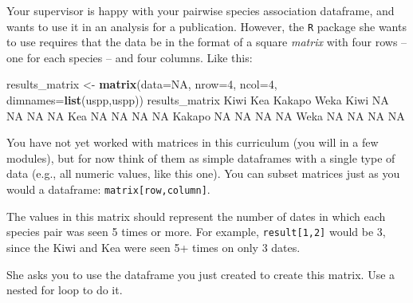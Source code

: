\documentclass[
]{book}
\newenvironment{Shaded}{\begin{snugshade}}{\end{snugshade}}
\newcommand{\DataTypeTok}[1]{\textcolor[rgb]{0.13,0.29,0.53}{#1}}
\newcommand{\DecValTok}[1]{\textcolor[rgb]{0.00,0.00,0.81}{#1}}
\newcommand{\KeywordTok}[1]{\textcolor[rgb]{0.13,0.29,0.53}{\textbf{#1}}}
\newcommand{\NormalTok}[1]{#1}
\newcommand{\OtherTok}[1]{\textcolor[rgb]{0.56,0.35,0.01}{#1}}
\newcommand{\StringTok}[1]{\textcolor[rgb]{0.31,0.60,0.02}{#1}}
\begin{document}
Your supervisor is happy with your pairwise species association dataframe, and wants to use it in an analysis for a publication. However, the \texttt{R} package she wants to use requires that the data be in the format of a square \emph{matrix} with four rows -- one for each species -- and four columns. Like this:

\begin{Shaded}
\begin{Highlighting}[]
\NormalTok{results_matrix <-}\StringTok{ }\KeywordTok{matrix}\NormalTok{(}\DataTypeTok{data=}\OtherTok{NA}\NormalTok{, }\DataTypeTok{nrow=}\DecValTok{4}\NormalTok{, }\DataTypeTok{ncol=}\DecValTok{4}\NormalTok{, }\DataTypeTok{dimnames=}\KeywordTok{list}\NormalTok{(uspp,uspp))}
\NormalTok{results_matrix}
\NormalTok{       Kiwi Kea Kakapo Weka}
\NormalTok{Kiwi     }\OtherTok{NA}  \OtherTok{NA}     \OtherTok{NA}   \OtherTok{NA}
\NormalTok{Kea      }\OtherTok{NA}  \OtherTok{NA}     \OtherTok{NA}   \OtherTok{NA}
\NormalTok{Kakapo   }\OtherTok{NA}  \OtherTok{NA}     \OtherTok{NA}   \OtherTok{NA}
\NormalTok{Weka     }\OtherTok{NA}  \OtherTok{NA}     \OtherTok{NA}   \OtherTok{NA}
\end{Highlighting}
\end{Shaded}

You have not yet worked with matrices in this curriculum (you will in a few modules), but for now think of them as simple dataframes with a single type of data (e.g., all numeric values, like this one). You can subset matrices just as you would a dataframe: \texttt{matrix{[}row,column{]}}.

The values in this matrix should represent the number of dates in which each species pair was seen 5 times or more. For example, \texttt{result{[}1,2{]}} would be 3, since the Kiwi and Kea were seen 5+ times on only 3 dates.

She asks you to use the dataframe you just created to create this matrix. Use a nested for loop to do it.
\end{document}
